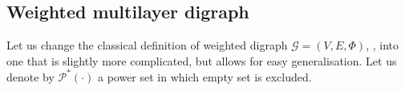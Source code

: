 \documentclass[a4paper,12pt]{article}
\theoremstyle{definition}
\newtheorem{definition}{Definition}%
\theoremstyle{remark}
\newcommand{\mat}[1]{\todo[inline,color=cMat]{\color{black}#1}}
\newcommand{\aadd}[2][]{\added[id=Alex,comment=#1]{#2}}
\newcommand{\gadd}[2][]{\added[id=Gokhan,comment=#1]{#2}}
\newcommand{\gdel}[2][]{\deleted[id=Gokhan,comment=#1]{#2}}
\newcommand{\mG}{\mathcal{G}}
\newcommand{\EG}{E_{\mathcal{G}}}
\begin{document}
\subsection{Weighted multilayer digraph}\label{sec:m_graph}
Let us change the classical definition of weighted  digraph $\mG = (V,E,\Phi)$, \cite[Sec.~2.1]{KivArena2014}, into one that is slightly more complicated, but allows for easy generalisation. Let us denote by $\mathcal{P}^*(\cdot)$ a power set in which \gdel{an} \gadd{the} empty set is excluded.
\end{document}
